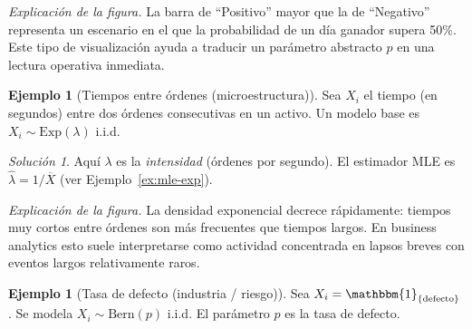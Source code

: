\documentclass[11pt]{article}
\theoremstyle{plain}
\theoremstyle{definition}
\newtheorem{example}[theorem]{Ejemplo}
\theoremstyle{remark}
\theoremstyle{solstyle}
\newtheorem*{solution}{Solución}
\newcommand{\1}{\mathbbm{1}}
\begin{document}
\begin{center}
\end{center}

\noindent\textit{Explicación de la figura.} La barra de ``Positivo'' mayor que la de ``Negativo'' representa un escenario en el que la probabilidad de un día ganador supera 50\%. Este tipo de visualización ayuda a traducir un parámetro abstracto $p$ en una lectura operativa inmediata.

\begin{example}[Tiempos entre órdenes (microestructura)]\label{ex:model-exp}
Sea $X_i$ el tiempo (en segundos) entre dos órdenes consecutivas en un activo.
Un modelo base es $X_i\sim \mathrm{Exp}(\lambda)$ i.i.d.
\end{example}

\begin{solution}
Aquí $\lambda$ es la \emph{intensidad} (órdenes por segundo).
El estimador MLE es $\widehat\lambda=1/\overline X$ (ver Ejemplo~\ref{ex:mle-exp}).
\end{solution}

\begin{center}
\end{center}

\noindent\textit{Explicación de la figura.} La densidad exponencial decrece rápidamente: tiempos muy cortos entre órdenes son más frecuentes que tiempos largos. En business analytics esto suele interpretarse como actividad concentrada en lapsos breves con eventos largos relativamente raros.

\begin{example}[Tasa de defecto (industria / riesgo)]\label{ex:model-default}
Sea $X_i=\1_{\{\text{defecto}\}}$. Se modela $X_i\sim \mathrm{Bern}(p)$ i.i.d.
El parámetro $p$ es la tasa de defecto.
\end{example}
\end{document}

